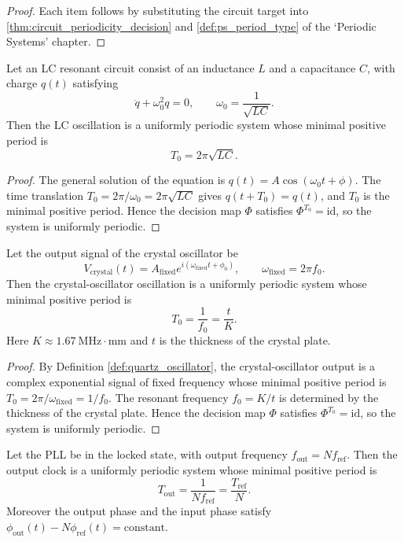 \begin{proof}
Each item follows by substituting the circuit target into \cref{thm:circuit_periodicity_decision} and \cref{def:ps_period_type} of the `Periodic Systems' chapter.
\end{proof}

\begin{lemma}\label{lem:lc_oscillator_periodic}
Let an LC resonant circuit consist of an inductance $L$ and a capacitance $C$, with charge $q(t)$ satisfying
\[
\ddot q+\omega_0^2q=0,\qquad \omega_0=\frac{1}{\sqrt{LC}}.
\]
Then the LC oscillation is a uniformly periodic system whose minimal positive period is
\[
T_0=2\pi\sqrt{LC}.
\]
\end{lemma}

\begin{proof}
The general solution of the equation is $q(t)=A\cos(\omega_0t+\phi)$. The time translation $T_0=2\pi/\omega_0=2\pi\sqrt{LC}$ gives $q(t+T_0)=q(t)$, and $T_0$ is the minimal positive period. Hence the decision map $\Phi$ satisfies $\Phi^{T_0}=\mathrm{id}$, so the system is uniformly periodic.
\end{proof}

\begin{lemma}\label{lem:quartz_periodic}
Let the output signal of the crystal oscillator be
\[
V_{\text{crystal}}(t)=A_{\text{fixed}}e^{i(\omega_{\text{fixed}}t+\phi_0)},\qquad \omega_{\text{fixed}}=2\pi f_0.
\]
Then the crystal-oscillator oscillation is a uniformly periodic system whose minimal positive period is
\[
T_0=\frac{1}{f_0}=\frac{t}{K}.
\]
Here $K\approx 1.67\ \text{MHz}\cdot\text{mm}$ and $t$ is the thickness of the crystal plate.
\end{lemma}

\begin{proof}
By Definition \ref{def:quartz_oscillator}, the crystal-oscillator output is a complex exponential signal of fixed frequency whose minimal positive period is $T_0=2\pi/\omega_{\text{fixed}}=1/f_0$. The resonant frequency $f_0=K/t$ is determined by the thickness of the crystal plate. Hence the decision map $\Phi$ satisfies $\Phi^{T_0}=\mathrm{id}$, so the system is uniformly periodic.
\end{proof}

\begin{lemma}\label{lem:pll_periodic}
Let the PLL be in the locked state, with output frequency $f_{\text{out}}=Nf_{\text{ref}}$. Then the output clock is a uniformly periodic system whose minimal positive period is
\[
T_{\text{out}}=\frac{1}{Nf_{\text{ref}}}=\frac{T_{\text{ref}}}{N}.
\]
Moreover the output phase and the input phase satisfy $\phi_{\text{out}}(t)-N\phi_{\text{ref}}(t)=\text{constant}$.
\end{lemma}

